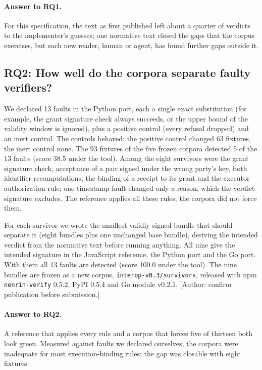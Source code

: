 \documentclass[11pt,a4paper]{article}
\newcommand{\code}[1]{\texttt{#1}}
\begin{document}
\paragraph{Answer to RQ1.} For this specification, the text as first published left about a quarter of verdicts to the implementer's guesses; one normative text closed the gaps that the corpus exercises, but each new reader, human or agent, has found further gaps outside it.

\subsection{RQ2: How well do the corpora separate faulty verifiers?}\label{sec:rq2}

We declared 13 faults in the Python port, each a single exact substitution (for example, the grant signature check always succeeds, or the upper bound of the validity window is ignored), plus a positive control (every refusal dropped) and an inert control. The controls behaved: the positive control changed 63 fixtures, the inert control none. The 93 fixtures of the five frozen corpora detected 5 of the 13 faults (score 38.5 under the tool). Among the eight survivors were the grant signature check, acceptance of a pair signed under the wrong party's key, both identifier recomputations, the binding of a receipt to its grant and the executor authorization rule; one timestamp fault changed only a reason, which the verdict signature excludes. The reference applies all these rules; the corpora did not force them.

For each survivor we wrote the smallest validly signed bundle that should separate it (eight bundles plus one unchanged base bundle), deriving the intended verdict from the normative text before running anything. All nine give the intended signature in the JavaScript reference, the Python port and the Go port. With them all 13 faults are detected (score 100.0 under the tool). The nine bundles are frozen as a new corpus, \code{interop-v0.3/survivors}, released with npm \code{nenrin-verify} 0.5.2, PyPI 0.5.4 and Go module v0.2.1. [Author: confirm publication before submission.]

\paragraph{Answer to RQ2.} A reference that applies every rule and a corpus that forces five of thirteen both look green. Measured against faults we declared ourselves, the corpora were inadequate for most execution-binding rules; the gap was closable with eight fixtures.
\end{document}
